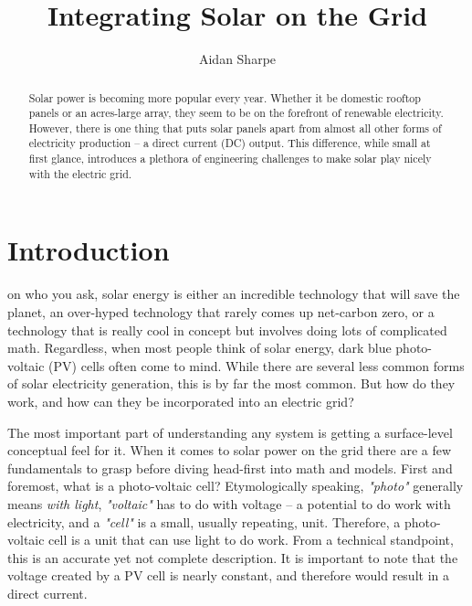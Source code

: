 \documentclass[journal]{IEEEtran}
\title{Integrating Solar on the Grid}
\author{Aidan Sharpe}
\begin{document}
	\maketitle
	\begin{abstract}
		Solar power is becoming more popular every year. Whether it be domestic rooftop panels or an acres-large array, they seem to be on the forefront of renewable electricity. However, there is one thing that puts solar panels apart from almost all other forms of electricity production -- a direct current (DC) output. This difference, while small at first glance, introduces a plethora of engineering challenges to make solar play nicely with the electric grid. 
	\end{abstract}

	\section{Introduction}
	 on who you ask, solar energy is either an incredible technology that will save the planet, an over-hyped technology that rarely comes up net-carbon zero, or a technology that is really cool in concept but involves doing lots of complicated math. Regardless, when most people think of solar energy, dark blue photo-voltaic (PV) cells often come to mind. While there are several less common forms of solar electricity generation, this is by far the most common. But how do they work, and how can they be incorporated into an electric grid?
	
	The most important part of understanding any system is getting a surface-level conceptual feel for it. When it comes to solar power on the grid there are a few fundamentals to grasp before diving head-first into math and models. First and foremost, what is a photo-voltaic cell? Etymologically speaking, \textit{"photo"} generally means \textit{with light}, \textit{"voltaic"} has to do with voltage -- a potential to do work with electricity, and a \textit{"cell"} is a small, usually repeating, unit. Therefore, a photo-voltaic cell is a unit that can use light to do work. From a technical standpoint, this is an accurate yet not complete description. It is important to note that the voltage created by a PV cell is nearly constant, and therefore would result in a direct current.
	
\end{document}
